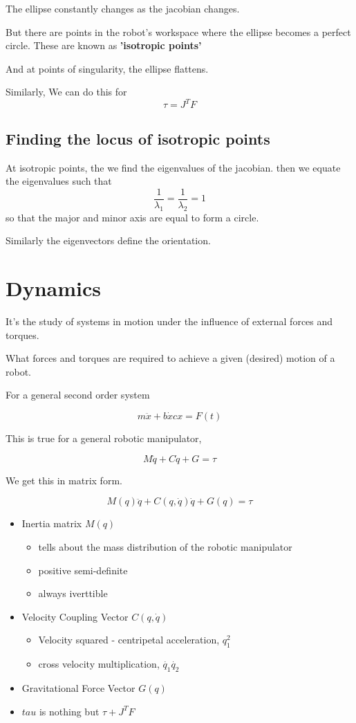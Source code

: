 \documentclass[11pt]{report}
\begin{document}
The ellipse constantly changes as the jacobian changes.

But there are points in the robot's workspace where the ellipse becomes a perfect circle. These are known as \textbf{'isotropic points'}

And at points of singularity, the ellipse flattens.

Similarly,
We can do this for
$$\tau = J^T F$$
\section{Finding the locus of isotropic points}
\label{sec:org43a405f}
At isotropic points, the we find the eigenvalues of the jacobian. then we equate the eigenvalues such that $$\frac{1}{\lambda_{1}} = \frac{1}{\lambda_2}=1$$ so that the major and minor axis are equal to form a circle.

Similarly the eigenvectors define the orientation.
\chapter{Dynamics}
\label{sec:org0796bd0}
It's the study of systems in motion under the influence of external forces and torques.

What forces and torques are required to achieve a given (desired) motion of a robot.

For a general second order system

\[ m\ddot{x} + b \dot{x} c x = F(t) \]

This is true for a general robotic manipulator,

$$M \ddot{q} + C \dot{q} + G = \tau$$

We get this in matrix form.

$$M(q) \ddot{q} + C(q,\dot{q})\dot{q} + G(q) = \tau$$

\begin{itemize}
\item Inertia matrix \(M(q)\)
\begin{itemize}
\item tells about the mass distribution of the robotic manipulator
\item positive semi-definite
\item always iverttible
\end{itemize}
\item Velocity Coupling Vector \(C(q,\dot{q})\)
\begin{itemize}
\item Velocity squared - centripetal acceleration, \(q_{1}^2\)
\item cross velocity multiplication, \(\dot{q_1}\dot{q_2}\)
\end{itemize}
\item Gravitational Force Vector \(G(q)\)
\item \(tau\) is nothing but \(\tau + J^TF\)
\end{itemize}
\end{document}
